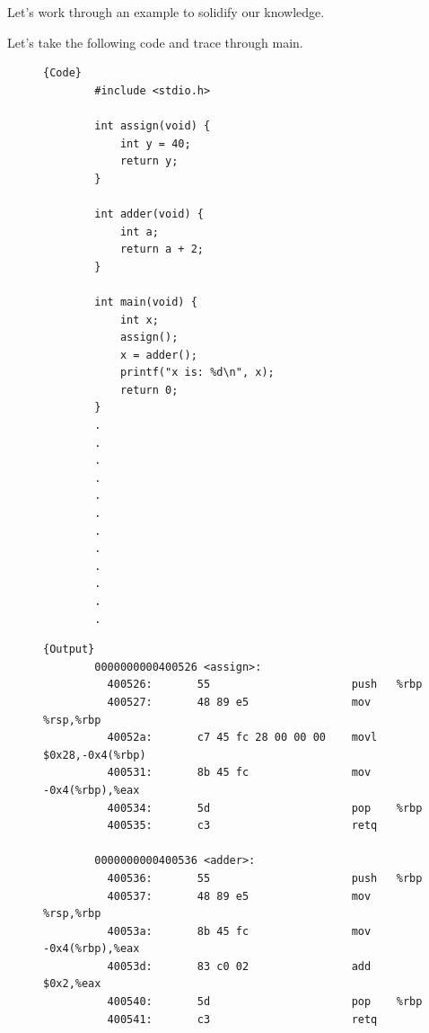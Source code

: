   Let's work through an example to solidify our knowledge. 

  \begin{example}
    \label{ex:calling-functions-in-assembly}
    Let's take the following code and trace through main. 
    \begin{figure}[H]
      \centering 
      \noindent\begin{minipage}{.25\textwidth}
      \begin{lstlisting}[]{Code}
        #include <stdio.h>

        int assign(void) {
            int y = 40;
            return y;
        }

        int adder(void) {
            int a;
            return a + 2;
        }

        int main(void) {
            int x;
            assign();
            x = adder();
            printf("x is: %d\n", x);
            return 0;
        }
        .
        .
        .
        .
        .
        .
        .
        .
        .
        .
        .
        .
      \end{lstlisting}
      \end{minipage}
      \hfill
      \begin{minipage}{.74\textwidth}
      \begin{lstlisting}[]{Output}
        0000000000400526 <assign>:
          400526:       55                      push   %rbp
          400527:       48 89 e5                mov    %rsp,%rbp
          40052a:       c7 45 fc 28 00 00 00    movl   $0x28,-0x4(%rbp)
          400531:       8b 45 fc                mov    -0x4(%rbp),%eax
          400534:       5d                      pop    %rbp
          400535:       c3                      retq

        0000000000400536 <adder>:
          400536:       55                      push   %rbp
          400537:       48 89 e5                mov    %rsp,%rbp
          40053a:       8b 45 fc                mov    -0x4(%rbp),%eax
          40053d:       83 c0 02                add    $0x2,%eax
          400540:       5d                      pop    %rbp
          400541:       c3                      retq


\end{lstlisting}
\end{minipage}
\end{figure}
\end{example}
